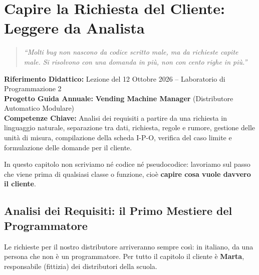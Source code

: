 \chapter[Capire la Richiesta del Cliente: Leggere da Analista]{Capire la Richiesta del Cliente:\\ Leggere da Analista}
\label{chap:comprensione-richieste}

\begin{quote}
\itshape
\small
``Molti bug non nascono da codice scritto male, ma da richieste capite male. Si risolvono con una domanda in più, non con cento righe in più.''
\end{quote}
\vspace{1em}

\noindent\textbf{Riferimento Didattico:} Lezione del 12 Ottobre 2026 -- Laboratorio di Programmazione 2\\
\textbf{Progetto Guida Annuale:} \textbf{\color{PiazzaPrimary}Vending Machine Manager} (Distributore Automatico Modulare)\\
\textbf{Competenze Chiave:} Analisi dei requisiti a partire da una richiesta in linguaggio naturale, separazione tra dati, richiesta, regole e rumore, gestione delle unità di misura, compilazione della scheda I-P-O, verifica del caso limite e formulazione delle domande per il cliente.

\vspace{1.5em}

\noindent In questo capitolo non scriviamo né codice né pseudocodice: lavoriamo sul passo che viene prima di qualsiasi classe o funzione, cioè \textbf{capire cosa vuole davvero il cliente}.

\section{Analisi dei Requisiti: il Primo Mestiere del Programmatore}

Le richieste per il nostro distributore arriveranno sempre così: in italiano, da una persona che non è un programmatore. Per tutto il capitolo il cliente è \textbf{Marta}, responsabile (fittizia) dei distributori della scuola.

